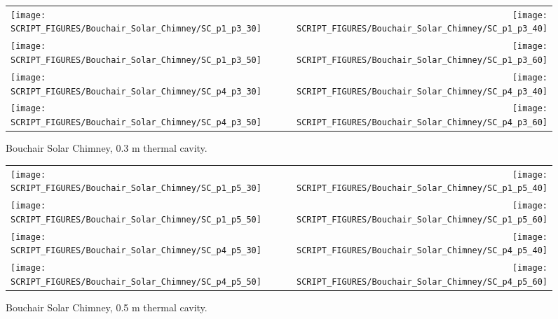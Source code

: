 \begin{figure}[p]
\begin{tabular*}{\textwidth}{l@{\extracolsep{\fill}}r}
\texttt{[image: SCRIPT\_FIGURES/Bouchair\_Solar\_Chimney/SC\_p1\_p3\_30]} &
\texttt{[image: SCRIPT\_FIGURES/Bouchair\_Solar\_Chimney/SC\_p1\_p3\_40]} \\
\texttt{[image: SCRIPT\_FIGURES/Bouchair\_Solar\_Chimney/SC\_p1\_p3\_50]} &
\texttt{[image: SCRIPT\_FIGURES/Bouchair\_Solar\_Chimney/SC\_p1\_p3\_60]} \\
\texttt{[image: SCRIPT\_FIGURES/Bouchair\_Solar\_Chimney/SC\_p4\_p3\_30]} &
\texttt{[image: SCRIPT\_FIGURES/Bouchair\_Solar\_Chimney/SC\_p4\_p3\_40]} \\
\texttt{[image: SCRIPT\_FIGURES/Bouchair\_Solar\_Chimney/SC\_p4\_p3\_50]} &
\texttt{[image: SCRIPT\_FIGURES/Bouchair\_Solar\_Chimney/SC\_p4\_p3\_60]}
\end{tabular*}
\caption[Bouchair Solar Chimney, 0.3 m thermal cavity]{Bouchair Solar Chimney, 0.3 m thermal cavity.}
\label{Bouchair_p3}
\end{figure}

\begin{figure}[p]
\begin{tabular*}{\textwidth}{l@{\extracolsep{\fill}}r}
\texttt{[image: SCRIPT\_FIGURES/Bouchair\_Solar\_Chimney/SC\_p1\_p5\_30]} &
\texttt{[image: SCRIPT\_FIGURES/Bouchair\_Solar\_Chimney/SC\_p1\_p5\_40]} \\
\texttt{[image: SCRIPT\_FIGURES/Bouchair\_Solar\_Chimney/SC\_p1\_p5\_50]} &
\texttt{[image: SCRIPT\_FIGURES/Bouchair\_Solar\_Chimney/SC\_p1\_p5\_60]} \\
\texttt{[image: SCRIPT\_FIGURES/Bouchair\_Solar\_Chimney/SC\_p4\_p5\_30]} &
\texttt{[image: SCRIPT\_FIGURES/Bouchair\_Solar\_Chimney/SC\_p4\_p5\_40]} \\
\texttt{[image: SCRIPT\_FIGURES/Bouchair\_Solar\_Chimney/SC\_p4\_p5\_50]} &
\texttt{[image: SCRIPT\_FIGURES/Bouchair\_Solar\_Chimney/SC\_p4\_p5\_60]}
\end{tabular*}
\caption[Bouchair Solar Chimney, 0.5 m thermal cavity]{Bouchair Solar Chimney, 0.5 m thermal cavity.}
\label{Bouchair_p5}
\end{figure}

